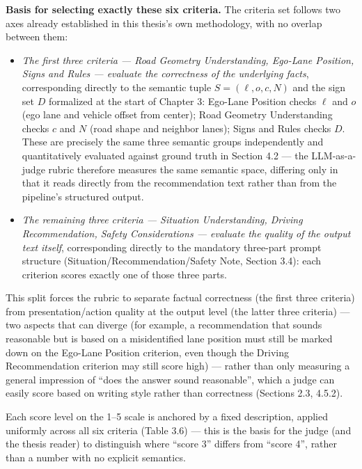 \documentclass[12pt,a4paper]{report}
\begin{document}
\textbf{Basis for selecting exactly these six criteria.} The criteria set follows two axes already established in this thesis's own methodology, with no overlap between them:

\begin{itemize}
    \item \textit{The first three criteria --- Road Geometry Understanding, Ego-Lane Position, Signs and Rules --- evaluate the correctness of the underlying facts}, corresponding directly to the semantic tuple $S=(\ell,o,c,N)$ and the sign set $D$ formalized at the start of Chapter 3: Ego-Lane Position checks $\ell$ and $o$ (ego lane and vehicle offset from center); Road Geometry Understanding checks $c$ and $N$ (road shape and neighbor lanes); Signs and Rules checks $D$. These are precisely the same three semantic groups independently and quantitatively evaluated against ground truth in Section 4.2 --- the LLM-as-a-judge rubric therefore measures the same semantic space, differing only in that it reads directly from the recommendation text rather than from the pipeline's structured output.
    \item \textit{The remaining three criteria --- Situation Understanding, Driving Recommendation, Safety Considerations --- evaluate the quality of the output text itself}, corresponding directly to the mandatory three-part prompt structure (Situation/Recommendation/Safety Note, Section 3.4): each criterion scores exactly one of those three parts.
\end{itemize}

This split forces the rubric to separate factual correctness (the first three criteria) from presentation/action quality at the output level (the latter three criteria) --- two aspects that can diverge (for example, a recommendation that sounds reasonable but is based on a misidentified lane position must still be marked down on the Ego-Lane Position criterion, even though the Driving Recommendation criterion may still score high) --- rather than only measuring a general impression of ``does the answer sound reasonable'', which a judge can easily score based on writing style rather than correctness (Sections 2.3, 4.5.2).

Each score level on the 1--5 scale is anchored by a fixed description, applied uniformly across all six criteria (Table 3.6) --- this is the basis for the judge (and the thesis reader) to distinguish where ``score 3'' differs from ``score 4'', rather than a number with no explicit semantics.
\end{document}
